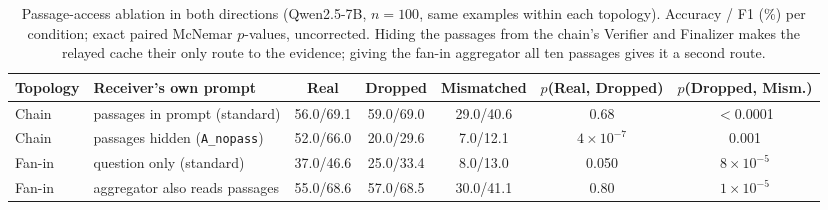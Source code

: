 \documentclass[11pt]{article}
\begin{document}
\begin{table}[t]
\centering
\small
\caption{Passage-access ablation in both directions (Qwen2.5-7B, $n{=}100$, same
examples within each topology). Accuracy / F1 (\%) per condition; exact paired
McNemar $p$-values, uncorrected. Hiding the passages from the chain's Verifier and
Finalizer makes the relayed cache their only route to the evidence; giving the
fan-in aggregator all ten passages gives it a second route.}
\label{tab:nopass}
\begin{tabular}{llccccc}
\toprule
\textbf{Topology} & \textbf{Receiver's own prompt} & \textcolor{realblue}{\textbf{Real}} & \textbf{Dropped} & \textcolor{wrongred}{\textbf{Mismatched}} & $p$(Real, Dropped) & $p$(Dropped, Mism.) \\
\midrule
Chain  & passages in prompt (standard) & 56.0/69.1 & 59.0/69.0 & 29.0/40.6 & 0.68 & $<$0.0001 \\
Chain  & passages hidden (\texttt{A\_nopass}) & 52.0/66.0 & 20.0/29.6 & 7.0/12.1 & $4\times10^{-7}$ & 0.001 \\
\midrule
Fan-in & question only (standard) & 37.0/46.6 & 25.0/33.4 & 8.0/13.0 & 0.050 & $8\times10^{-5}$ \\
Fan-in & aggregator also reads passages & 55.0/68.6 & 57.0/68.5 & 30.0/41.1 & 0.80 & $1\times10^{-5}$ \\
\bottomrule
\end{tabular}
\end{table}
\end{document}
